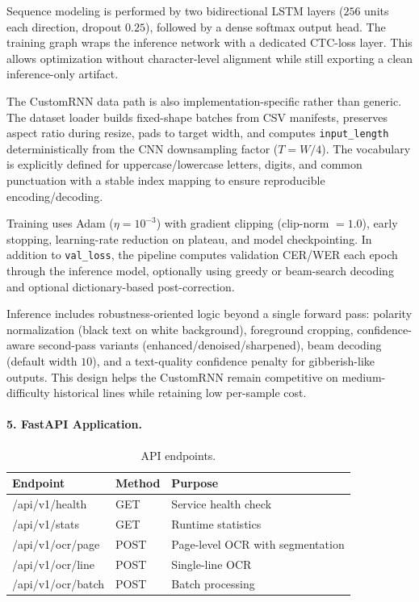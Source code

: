\documentclass[12pt,a4paper]{article}
\begin{document}
Sequence modeling is performed by two bidirectional LSTM layers
($256$ units each direction, dropout $0.25$), followed by a dense
softmax output head. The training graph wraps the inference network
with a dedicated CTC-loss layer. This allows optimization without
character-level alignment while still exporting a clean inference-only
artifact.

The CustomRNN data path is also implementation-specific rather than
generic. The dataset loader builds fixed-shape batches from CSV
manifests, preserves aspect ratio during resize, pads to target width,
and computes \texttt{input\_length} deterministically from the CNN
downsampling factor ($T = W/4$). The vocabulary is explicitly defined
for uppercase/lowercase letters, digits, and common punctuation with a
stable index mapping to ensure reproducible encoding/decoding.

Training uses Adam ($\eta=10^{-3}$) with gradient clipping
(clip-norm $=1.0$), early stopping, learning-rate reduction on
plateau, and model checkpointing. In addition to \texttt{val\_loss},
the pipeline computes validation CER/WER each epoch through the
inference model, optionally using greedy or beam-search decoding and
optional dictionary-based post-correction.

Inference includes
robustness-oriented logic beyond a single forward pass: polarity
normalization (black text on white background), foreground cropping,
confidence-aware second-pass variants (enhanced/denoised/sharpened),
beam decoding (default width $10$), and a text-quality confidence
penalty for gibberish-like outputs. This design helps the CustomRNN
remain competitive on medium-difficulty historical lines while
retaining low per-sample cost.

\paragraph{5. FastAPI Application.}

\begin{table}[H]
  \centering
  \small
  \begin{tabular}{lll}
    \toprule
    \textbf{Endpoint} & \textbf{Method} & \textbf{Purpose} \\
    \midrule
    /api/v1/health & GET & Service health check \\
    /api/v1/stats  & GET & Runtime statistics \\
    /api/v1/ocr/page & POST & Page-level OCR with segmentation \\
    /api/v1/ocr/line & POST & Single-line OCR \\
    /api/v1/ocr/batch & POST & Batch processing \\
    \bottomrule
  \end{tabular}
  \caption{API endpoints.}
\end{table}
\end{document}
